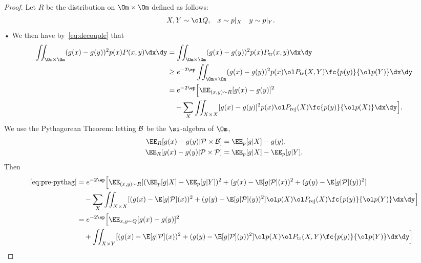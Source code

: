 \begin{proof}
Let $R$ be the distribution on $\Om\times\Om$ defined as follows:
\begin{align}
X,Y&\sim \ol Q, &
x&\sim p|_X &
y&\sim p|_Y.
\end{align}•
We then have by~\eqref{eq:decouple} that
\begin{align}
\iint_{\Om\times \Om}(g(x)-g(y))^2 p(x)P(x,y)\dx\dy
&= \iint_{\Om\times \Om}(g(x)-g(y))^2 p(x)P_{\text{tr}}(x,y)\dx\dy\\
&\ge e^{-2\ep}\iint_{\Om\times \Om}(g(x)-g(y))^2 p(x) \ol P_{\text{tr}}(X,Y) \fc{p(y)}{\ol p(Y)} \dx\dy
\\
&=e^{-2\ep}\Big[\EE_{(x,y)\sim R} [g(x)-g(y)]^2\\
&\quad 
 - \sum_{X} \iint_{X\times X}[g(x)-g(y)]^2 p(x) \ol P_{\text{rej}}(X)\fc{p(y)}{\ol p(X)}\dx\dy\Big].
\label{eq:pre-pythag}
\end{align}
We use the Pythagorean Theorem: letting $\cal B$ be the $\si$-algebra of $\Om$,
\begin{align}
\EE_R[g(x)-g(y)|\cal P\times \cal B] &= \EE_p[g|X] - g(y),\\
\EE_R[g(x)-g(y)|\cal P\times \cal P] &= \EE_p[g|X] - \EE_p[g|Y].
\end{align}
Then 
\begin{align}
\eqref{eq:pre-pythag}
&= e^{-2\ep} \Big[\EE_{(x,y)\sim R} [(\EE_p[g|X] - \EE_p[g|Y])^2
+ (g(x)-\E[g|\cal P](x))^2 + (g(y) - \E[g|\cal P](y))^2]\\
&\quad  - \sum_X \iint_{X\times X} [(g(x)-\E[g|\cal P](x))^2 + (g(y) - \E[g|\cal P](y))^2] \ol p(X) \ol P_{\text{rej}}(X) \fc{p(y)}{\ol p(Y)}\dx\dy\Big]\\
&= e^{-2\ep} \Big[
\EE_{x,y\sim Q} [g(x)-g(y)]^2\\
&\quad + \iint_{X\times Y} [(g(x)-\E[g|\cal P](x))^2 + (g(y)-\E[g|\cal P](y))^2] \ol p(X) \ol P_{\text{tr}}(X,Y) \fc{p(y)}{\ol p(Y)}\dx\dy
\Big]\label{eq:numer-decomp}
\end{align}


\end{proof}
